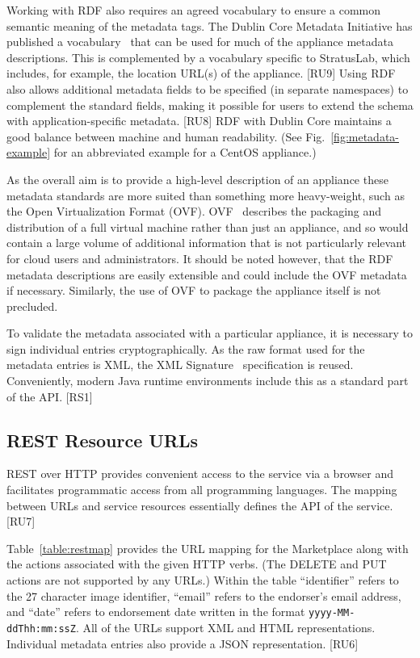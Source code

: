 Working with RDF also requires an agreed vocabulary to ensure a common
semantic meaning of the metadata tags.  The Dublin Core Metadata
Initiative has published a vocabulary~\cite{dcterms} that can be used
for much of the appliance metadata descriptions.  This is complemented
by a vocabulary specific to StratusLab, which includes, for example,
the location URL(s) of the appliance. [RU9] Using RDF also allows
additional metadata fields to be specified (in separate namespaces) to
complement the standard fields, making it possible for users to extend
the schema with application-specific metadata. [RU8] RDF with Dublin
Core maintains a good balance between machine and human
readability. (See Fig.~\ref{fig:metadata-example} for an abbreviated
example for a CentOS appliance.)

As the overall aim is to provide a high-level description of an
appliance these metadata standards are more suited than something more
heavy-weight, such as the Open Virtualization Format
(OVF). OVF~\cite{ovf} describes the packaging and distribution of a
full virtual machine rather than just an appliance, and so would
contain a large volume of additional information that is not
particularly relevant for cloud users and administrators. It should be
noted however, that the RDF metadata descriptions are easily
extensible and could include the OVF metadata if necessary.
Similarly, the use of OVF to package the appliance itself is not
precluded.

To validate the metadata associated with a particular appliance, it is
necessary to sign individual entries cryptographically.  As the raw
format used for the metadata entries is XML, the XML
Signature~\cite{xmlsig} specification is reused.  Conveniently, modern
Java runtime environments include this as a standard part of the
API\@. [RS1]

\subsection{REST Resource URLs}

REST over HTTP provides convenient access to the service via a browser
and facilitates programmatic access from all programming languages.
The mapping between URLs and service resources essentially defines the
API of the service. [RU7]

Table~\ref{table:restmap} provides the URL mapping for the Marketplace
along with the actions associated with the given HTTP verbs.  (The
DELETE and PUT actions are not supported by any URLs.)  Within the
table ``identifier'' refers to the 27 character image identifier,
``email'' refers to the endorser's email address, and ``date'' refers
to endorsement date written in the format {\tt yyyy-MM-ddThh:mm:ssZ}.
All of the URLs support XML and HTML representations.  Individual
metadata entries also provide a JSON representation. [RU6]

